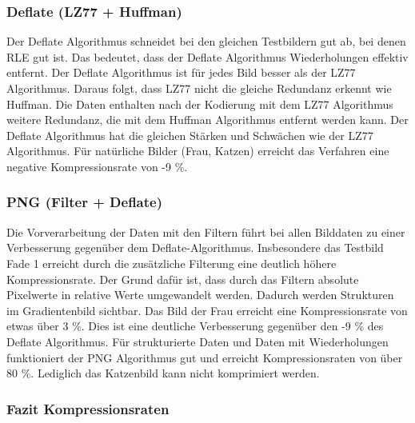 \documentclass[conference]{IEEEtran}
\begin{document}
\subsubsection{Deflate (LZ77 + Huffman)}

Der Deflate Algorithmus schneidet bei den gleichen Testbildern gut ab, bei
denen RLE gut ist.
Das bedeutet, dass der Deflate Algorithmus Wiederholungen effektiv entfernt.
Der Deflate Algorithmus ist für jedes Bild besser als der LZ77 Algorithmus.
Daraus folgt, dass LZ77 nicht die gleiche Redundanz erkennt wie Huffman.
Die Daten enthalten nach der Kodierung mit dem LZ77 Algorithmus weitere
Redundanz, die mit dem Huffman Algorithmus entfernt werden kann.
Der Deflate Algorithmus hat die gleichen Stärken und Schwächen wie der LZ77 Algorithmus.
Für natürliche Bilder (Frau, Katzen) erreicht das Verfahren eine negative
Kompressionsrate von -9 \%.

\subsubsection{PNG (Filter + Deflate)}

Die Vorverarbeitung der Daten mit den Filtern führt bei allen Bilddaten zu einer
Verbesserung gegenüber dem Deflate-Algorithmus.
Insbesondere das Testbild Fade 1 erreicht durch die zusätzliche Filterung
eine deutlich höhere Kompressionsrate.
Der Grund dafür ist, dass durch das Filtern absolute Pixelwerte in relative Werte
umgewandelt werden.
Dadurch werden Strukturen im Gradientenbild sichtbar.
Das Bild der Frau erreicht eine Kompressionsrate von etwas über 3 \%.
Dies ist eine deutliche Verbesserung gegenüber den -9 \% des Deflate Algorithmus.
Für strukturierte Daten und Daten mit Wiederholungen funktioniert der
PNG Algorithmus gut und erreicht Kompressionsraten von über 80 \%.
Lediglich das Katzenbild kann nicht komprimiert werden.


\subsubsection{Fazit Kompressionsraten}
\end{document}
